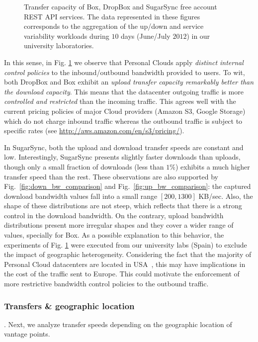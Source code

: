 \begin{figure}[t]
   \caption{Transfer capacity of Box, DropBox and SugarSync free account REST API services.
   The data represented in these figures corresponds to the aggregation
   of the up/down and service variability workloads during $10$ days (June/July $2012$) in our university laboratories.}
   \label{fig:transfer_mean_speeds_and_bw_distributions}
   \vspace{-4mm}
\end{figure}

In this sense, in Fig. \ref{fig:transfer_mean_speeds_and_bw_distributions} we observe  
that Personal Clouds apply \textit{distinct internal control policies}
to the inbound/outbound bandwidth provided to users. To wit,
both DropBox and Box exhibit an \textit{upload transfer capacity remarkably better
than the download capacity}. This means that the datacenter outgoing
traffic is more \textit{controlled and restricted} than the incoming traffic. This agrees
well with the current pricing policies of major Cloud providers (Amazon S3,
Google Storage) which do not charge inbound traffic whereas
the outbound traffic is subject to specific rates (see \url{http://aws.amazon.com/en/s3/pricing/}). 

In SugarSync, both the upload and download transfer speeds are constant and
low. Interestingly, SugarSync presents slightly faster downloads than uploads,
though only a small fraction of downloads (less than $1\%$) exhibits a much
higher transfer speed than the rest. These observations are also supported by Fig.~\ref{fig:down_bw_comparison} and Fig.~\ref{fig:up_bw_comparison}: the captured download
bandwidth values fall into a small range $[200, 1300]$ KB/sec. Also,
the shape of these distributions are not steep, which reflects that there is
a strong control in the download bandwidth.
On the contrary, upload bandwidth distributions present more irregular shapes and
they cover a wider range of values, specially for Box.
As a possible explanation to this behavior, the experiments of Fig. \ref{fig:transfer_mean_speeds_and_bw_distributions} 
were executed from our university labs (Spain) to exclude the impact of geographic heterogeneity. 
Considering the fact that the majority of 
Personal Cloud datacenters are located in USA~\cite{drago2013benchmarking}, 
this may have implications in the cost of the traffic sent to Europe. This could motivate
the enforcement of more restrictive bandwidth control policies to
the outbound traffic.
\medskip

\subsubsection*{Transfers \& geographic location}. 
Next, we analyze transfer speeds depending
on the geographic location of vantage points. 


